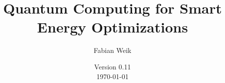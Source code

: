 \title{Quantum Computing for Smart Energy Optimizations}
\author{Fabian Weik}
\date{
  Version 0.11\\
  \today
}

